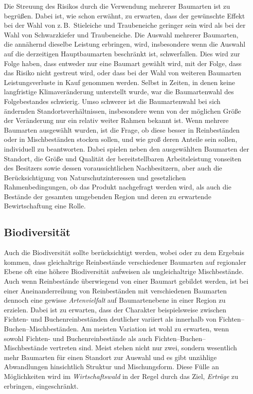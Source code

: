 \documentclass[twocolumn, paper=a4, fontsize=10pt, bibliography=totoc, index=totoc]{scrartcl}
\begin{document}
Die Streuung des Risikos durch die Verwendung mehrerer Baumarten ist zu
begrüßen. Dabei ist, wie schon erwähnt, zu erwarten, dass der gewünschte Effekt
bei der Wahl von z.\,B.\ Stieleiche und Traubeneiche geringer sein wird als bei
der Wahl von Schwarzkiefer und Traubeneiche. Die Auswahl mehrerer Baumarten, die
annähernd dieselbe Leistung erbringen, wird, insbesondere wenn die Auswahl auf
die derzeitigen Hauptbaumarten beschränkt ist, schwerfallen. Dies wird zur Folge
haben, dass entweder nur eine Baumart gewählt wird, mit der Folge, dass das
Risiko nicht gestreut wird, oder dass bei der Wahl von weiteren Baumarten
Leistungsverluste in Kauf genommen werden. Selbst in Zeiten, in denen keine
langfristige Klimaveränderung unterstellt wurde, war die Baumartenwahl des
Folgebestandes schwierig. Umso schwerer ist die Baumartenwahl bei sich ändernden
Standortsverhältnissen, insbesondere wenn von der möglichen Größe der
Veränderung nur ein relativ weiter Rahmen bekannt ist. Wenn mehrere Baumarten
ausgewählt wurden, ist die Frage, ob diese besser in Reinbeständen oder
in Mischbeständen stocken sollen, und wie groß deren Anteile sein sollen,
individuell zu beantworten. Dabei spielen neben den ausgewählten Baumarten der
Standort, die Größe und Qualität der bereitstellbaren Arbeitsleistung vonseiten
des Besitzers sowie dessen voraussichtlichen Nachbesitzern, aber auch die
Berücksichtigung von Naturschutzinteressen und gesetzlichen Rahmenbedingungen,
ob das Produkt nachgefragt werden wird, als auch die Bestände der gesamten
umgebenden Region und deren zu erwartende Bewirtschaftung eine Rolle.

\subsection{Biodiversität}
\label{ssec:biodiversitaet}

Auch die Biodiversität sollte berücksichtigt werden, wobei
\citet{heinrichs2019Reinbestand} oder \citet{schall2017Reinbestand} zu dem
Ergebnis kommen, dass gleichaltrige Reinbestände verschiedener Baumarten auf
regionaler Ebene oft eine höhere Biodiversität aufweisen als ungleichaltrige
Mischbestände. Auch wenn Reinbestände überwiegend von einer Baumart gebildet
werden, ist bei einer Aneinanderreihung von Reinbeständen mit verschiedenen
Baumarten dennoch eine gewisse \emph{Artenvielfalt} auf Baumartenebene in einer
Region zu erzielen. Dabei ist zu erwarten, dass der Charakter beispielsweise
zwischen Fichten- und Buchenreinbeständen deutlicher variiert als innerhalb
von Fichten--Buchen--Mischbeständen. Am meisten Variation ist wohl zu
erwarten, wenn sowohl Fichten- und Buchenreinbestände als auch
Fichten--Buchen--Mischbestände vertreten sind. Meist stehen nicht nur zwei,
sondern wesentlich mehr Baumarten für einen Standort zur Auswahl und es gibt
unzählige Abwandlungen hinsichtlich Struktur und Mischungsform. Diese Fülle an
Möglichkeiten wird im \emph{Wirtschaftswald} in der Regel durch das Ziel,
\emph{Erträge} zu erbringen, eingeschränkt.
\end{document}
